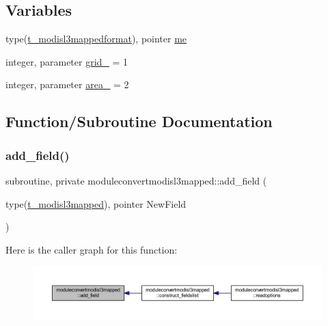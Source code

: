 \subsection*{Variables}
\begin{DoxyCompactItemize}
\item 
type(\mbox{\hyperlink{structmoduleconvertmodisl3mapped_1_1t__modisl3mappedformat}{t\+\_\+modisl3mappedformat}}), pointer \mbox{\hyperlink{namespacemoduleconvertmodisl3mapped_a1a142d4981ab45ab3eace9a2dd1fe02b}{me}}
\item 
integer, parameter \mbox{\hyperlink{namespacemoduleconvertmodisl3mapped_a790db33a2adf6b082ff7a6e70161046a}{grid\+\_\+}} = 1
\item 
integer, parameter \mbox{\hyperlink{namespacemoduleconvertmodisl3mapped_a5c80d28c4928b02232f725e7ad1b4c94}{area\+\_\+}} = 2
\end{DoxyCompactItemize}


\subsection{Function/\+Subroutine Documentation}
\mbox{\label{namespacemoduleconvertmodisl3mapped_a3fa5a2918388eb33951d0fcae3d4bbb6}} 
\subsubsection{\texorpdfstring{add\+\_\+field()}{add\_field()}}
{\footnotesize\ttfamily subroutine, private moduleconvertmodisl3mapped\+::add\+\_\+field (\begin{DoxyParamCaption}\item[{type(\mbox{\hyperlink{structmoduleconvertmodisl3mapped_1_1t__modisl3mapped}{t\+\_\+modisl3mapped}}), pointer}]{New\+Field }\end{DoxyParamCaption})\hspace{0.3cm}{\ttfamily [private]}}

Here is the caller graph for this function\+:\nopagebreak
\begin{figure}[H]
\begin{center}
\leavevmode
\includegraphics[width=350pt]{namespacemoduleconvertmodisl3mapped_a3fa5a2918388eb33951d0fcae3d4bbb6_icgraph}
\end{center}
\end{figure}
\mbox{\label{namespacemoduleconvertmodisl3mapped_ac229afc3a01cac186e0abd3c19093d2a}} 
